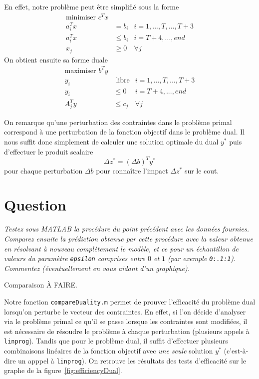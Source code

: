 \documentclass[12pt,oneside,a4paper]{article}
\newcommand{\question}
{
\addtocounter{section}{1}
\section*{Question \thesection}
}
\begin{document}
En effet, notre problème peut être simplifié sous la forme
\begin{align*} 
	\text{minimiser } c^T x \\
	a_i^T x &= b_i  & i = 1,...,T,...,T+3 \\
  a_i^T x &\leq b_i & i = T+4,...,end \\
	x_j &\geq 0 & \forall j
\end{align*}
On obtient ensuite sa forme duale
\begin{align*} 
	\text{maximiser } b^T y \\
	y_i &\text{ libre} & i = 1,...,T,...,T+3 \\
  y_i &\leq 0 & i = T+4,...,end \\
  A_j^T y &\leq c_j & \forall j
\end{align*}

On remarque qu'une perturbation des contraintes dans le problème primal
correspond à une perturbation de la fonction objectif dans le problème dual.
Il nous suffit donc simplement de calculer une solution optimale du dual $y^{*}$
puis d'effectuer le produit scalaire
\[ \Delta z^{*} = (\Delta b)^T y^{*} \]
pour chaque perturbation $\Delta b$ pour conna\^itre l'impact $\Delta z^{*}$
sur le cout.

\question %
\emph{Testez sous MATLAB la procédure du point précédent avec les données
fournies. Comparez ensuite la prédiction obtenue par cette procédure
avec la valeur obtenue en résolvant à nouveau complètement le modèle,
et ce pour un échantillon de valeurs du paramètre \texttt{epsilon} comprises
entre $0$ et $1$ (par exemple \texttt{0:.1:1}). 
Commentez (éventuellement en vous aidant d'un graphique).}

Comparaison À FAIRE.

Notre fonction \texttt{compareDuality.m} permet de prouver l'efficacité
du problème dual lorsqu'on perturbe le vecteur des contraintes.
En effet, si l'on décide d'analyser via le problème primal ce qu'il 
se passe lorsque les contraintes sont modifiées, il est nécessaire de 
résoudre le problème à chaque perturbation 
(plusieurs appels à \texttt{linprog}).
Tandis que pour le problème dual,
il suffit d'effectuer plusieurs combinaisons linéaires de la fonction objectif
avec \emph{une seule} solution $y^{*}$ 
(c'est-à-dire un apppel à \texttt{linprog}).
On retrouve les résultats des tests d'efficacité
sur le graphe de la figure~\ref{fig:efficiencyDual}.
\end{document}
